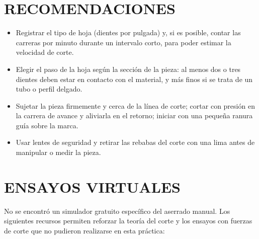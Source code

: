 \documentclass[12pt,a4paper]{article}
\begin{document}
\section{RECOMENDACIONES}

\begin{itemize}
	\item Registrar el tipo de hoja (dientes por pulgada) y, si es posible, contar
	      las carreras por minuto durante un intervalo corto, para poder estimar la
	      velocidad de corte.\\[-10pt]
	\item Elegir el paso de la hoja según la sección de la pieza: al menos dos o
	      tres dientes deben estar en contacto con el material, y más finos si se
	      trata de un tubo o perfil delgado.\\[-10pt]
	\item Sujetar la pieza firmemente y cerca de la línea de corte; cortar con
	      presión en la carrera de avance y aliviarla en el retorno; iniciar con
	      una
	      pequeña ranura guía sobre la marca.\\[-10pt]
	\item Usar lentes de seguridad y retirar las rebabas del corte con una lima
	      antes de manipular o medir la pieza.
\end{itemize}

\section{ENSAYOS VIRTUALES}

No se encontró un simulador gratuito específico del aserrado manual. Los
siguientes recursos permiten reforzar la teoría del corte y los ensayos con
fuerzas de corte que no pudieron realizarse en esta práctica:
\end{document}
